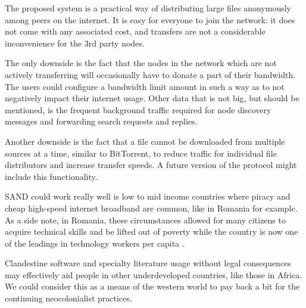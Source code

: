 The proposed system is a practical way of distributing large files anonymously 
among peers on the internet. It is easy for everyone to join the network: it 
does not come with any associated cost, and transfers are not a considerable 
inconvenience for the 3rd party nodes.

The only downside is the fact that the nodes in the network which are not 
actively transferring will occasionally have to donate a part of their 
bandwidth. The users could configure a bandwidth limit amount in such a way as 
to not negatively impact their internet usage. Other data that is not big, but 
should be mentioned, is the frequent background traffic required for node 
discovery messages and forwarding search requests and replies.

Another downside is the fact that a file cannot be downloaded from multiple 
sources at a time, similar to BitTorrent, to reduce traffic for individual file 
distributors and increase transfer speeds. A future version of the protocol 
might include this functionality.

SAND could work really well is low to mid income countries where piracy and 
cheap high-speed internet broadband are common, like in Romania for example. As 
a side note, in Romania, these circumstances allowed for many citizens to 
acquire technical skills and be lifted out of poverty while the country is now 
one of the leadings in technology workers per capita \cite{romaniasoftwaredev}.

Clandestine software and specialty literature usage without legal consequences 
may effectively aid people in other underdeveloped countries, like those in 
Africa. We could consider this as a means of the western world to pay back a 
bit for the continuing neocolonialist practices.
